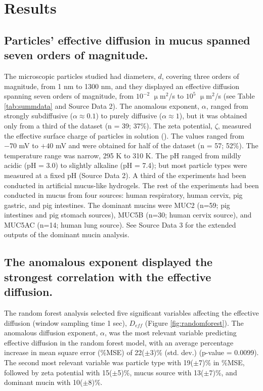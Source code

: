 \documentclass[aps,prl,preprint,superscriptaddress,showkeys,linenumbers]{revtex4-1}
\begin{document}
\section*{Results}

\subsection*{Particles' effective diffusion in mucus spanned seven orders of magnitude.}

The microscopic particles studied had diameters, $d$, covering three orders of magnitude, from 1 nm to 1300 nm, and they displayed an effective diffusion spanning seven orders of magnitude, from $10^{-2}$ $\upmu$m$^2$/s to $10^5$ $\upmu$m$^2$/s (see Table \ref{tab:summdata} and Source Data 2).
The anomalous exponent, $\alpha$, ranged from strongly subdiffusive ($\alpha \approx 0.1$) to purely diffusive ($\alpha \approx 1$), but it was obtained only from a third of the dataset (n = 39; 37\%). The zeta potential, $\zeta$, measured the effective surface charge of particles in solution (\cite{Kumar2017Methods}). The values ranged from $-70$ mV to $+40$ mV and were obtained for half of the dataset (n = 57; 52\%). The temperature range was narrow, 295 K to 310 K. The pH ranged from mildly acidic (pH = 3.0) to slightly alkaline (pH = 7.4); but most particle types were measured at a fixed pH (Source Data 2). A third of the experiments had been conducted in artificial mucus-like hydrogels. The rest of the experiments had been conducted in mucus from four sources: human respiratory, human cervix, pig gastric, and pig intestines. The dominant mucins were MUC2 (n=59; pig intestines and pig stomach sources), MUC5B (n=30; human cervix source), and MUC5AC (n=14; human lung source). See Source Data 3 for the extended outputs of the dominant mucin analysis.


\subsection*{The anomalous exponent \textcolor{Antonio}{displayed the strongest correlation with} the effective diffusion.}

The random forest analysis selected five significant variables affecting the effective diffusion (window sampling time 1 sec), $D_{eff}$ (Figure \ref{fig:randomforest}). The anomalous diffusion exponent, $\alpha$, was the \textcolor{Antonio}{most relevant variable predicting effective diffusion in the random forest model, with} an average percentage increase in mean square error (\%MSE) of 22($\pm$3)\% (std. dev.) (p-value = 0.0099). The second most \textcolor{Antonio}{relevant} variable was particle type with 19($\pm$7)\% in \%MSE, followed by zeta potential with 15($\pm$5)\%, mucus source with 13($\pm$7)\%, and dominant mucin with 10($\pm$8)\%.
\end{document}
